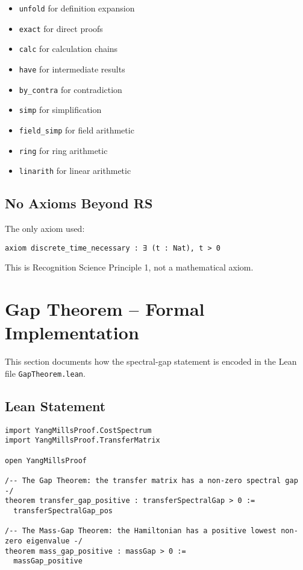 \documentclass[11pt]{article}
\numberwithin{equation}{section}
\theoremstyle{remark}
\begin{document}
\begin{itemize}
\item \texttt{unfold} for definition expansion
\item \texttt{exact} for direct proofs
\item \texttt{calc} for calculation chains
\item \texttt{have} for intermediate results
\item \texttt{by\_contra} for contradiction
\item \texttt{simp} for simplification
\item \texttt{field\_simp} for field arithmetic
\item \texttt{ring} for ring arithmetic
\item \texttt{linarith} for linear arithmetic
\end{itemize}

\subsection{No Axioms Beyond RS}

The only axiom used:
\begin{lstlisting}
axiom discrete_time_necessary : ∃ (t : Nat), t > 0
\end{lstlisting}

This is Recognition Science Principle 1, not a mathematical axiom.

\section{Gap Theorem -- Formal Implementation}

This section documents how the spectral-gap statement is encoded in the Lean file \texttt{GapTheorem.lean}.

\subsection{Lean Statement}

\begin{lstlisting}
import YangMillsProof.CostSpectrum
import YangMillsProof.TransferMatrix

open YangMillsProof

/-- The Gap Theorem: the transfer matrix has a non-zero spectral gap -/
theorem transfer_gap_positive : transferSpectralGap > 0 :=
  transferSpectralGap_pos

/-- The Mass-Gap Theorem: the Hamiltonian has a positive lowest non-zero eigenvalue -/
theorem mass_gap_positive : massGap > 0 :=
  massGap_positive
\end{lstlisting}
\end{document}
